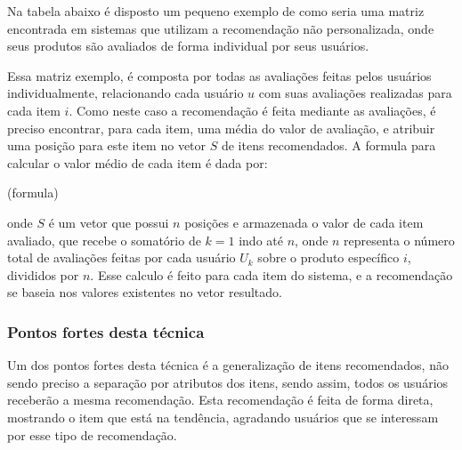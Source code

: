 \documentclass[12pt,
				openright,
				twoside,
				a4paper,
				apter=TITLE,
				section=TITLE,
				subsection=TITLE,
				chapter=TITLE,
				english,
				brazil]{abntex2}
\newcommand{\mc}[3]{\multicolumn{#1}{#2}{#3}}
\begin{document}
Na tabela abaixo é disposto um pequeno exemplo de como seria uma matriz encontrada em sistemas que utilizam a recomendação não personalizada, onde seus produtos são avaliados de forma individual por seus usuários.


Essa matriz exemplo, é composta por todas as avaliações feitas pelos usuários individualmente, relacionando cada usuário $u$ com suas avaliações realizadas para cada item $i$. Como neste caso a recomendação é feita mediante as avaliações, é preciso encontrar, para cada item, uma média do valor de avaliação, e atribuir uma posição para este item no vetor $S$ de itens recomendados. A formula para calcular o valor médio de cada item é dada por:

(formula)

onde $S$ é um vetor que possui $n$ posições e armazenada o valor de cada item avaliado, que recebe o somatório de $k = 1$ indo até $n$, onde $n$ representa o número total de avaliações feitas por cada usuário $U_{k}$ sobre o produto específico $i$, divididos por $n$. Esse calculo é feito para cada item do sistema, e a recomendação se baseia nos valores existentes no vetor resultado.

\subsubsection{Pontos fortes desta técnica}
Um dos pontos fortes desta técnica é a generalização de itens recomendados, não sendo preciso a separação por atributos dos itens, sendo assim, todos os usuários receberão a mesma recomendação. Esta recomendação é feita de forma direta, mostrando o item que está na tendência, agradando usuários que se interessam por esse tipo de recomendação.
\end{document}

